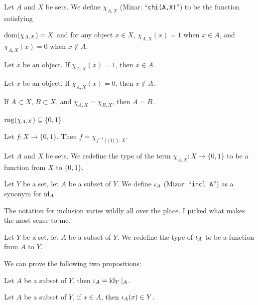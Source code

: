 \documentclass{article}
\begin{document}
\begin{definition}
Let $A$ and $X$ be sets.
We define $\chi_{A,X}$ (Mizar: ``\verb#chi(A,X)#'') to be the function
satisfying
\begin{defn}
\item $\operatorname{dom}(\chi_{A,X})=X$ and for any object $x\in X$,
  $\chi_{A,X}(x)=1$ when $x\in A$,
  and $\chi_{A,X}(x)=0$ when $x\notin A$.
\end{defn}
\end{definition}

\begin{thm}
\item\label{funct3:36} Let $x$ be an object.
  If $\chi_{A,X}(x)=1$, then $x\in A$.
\item\label{funct3:37} Let $x$ be an object.
  If $\chi_{A,X}(x)=0$, then $x\notin A$.
\item\label{funct3:38} If $A\subset X$, $B\subset X$, and $\chi_{A,X}=\chi_{B,X}$,
  then $A=B$.
\item\label{funct3:39} $\operatorname{rng}(\chi_{A,X})\subseteq\{0,1\}$.
\item\label{funct3:40} Let $f\colon X\to\{0,1\}$. Then $f=\chi_{f^{-1}(\{1\}),X}$.
\end{thm}

\begin{definition}
Let $A$ and $X$ be sets.
We redefine the type of the term $\chi_{A,X}\colon X\to\{0,1\}$
to be a function from $X$ to $\{0,1\}$.
\end{definition}

\begin{notation}
Let $Y$ be a set, let $A$ be a subset of $Y$.
We define $\iota_{A}$ (Mizar: ``\verb#incl A#'') as a synonym for $\operatorname{id}_{A}$.
\end{notation}

\begin{remark}
The notation for inclusion varies wildly all over the place. I picked
what makes the most sense to me.
\end{remark}

\begin{definition}
Let $Y$ be a set, let $A$ be a subset of $Y$.
We redefine the type of $\iota_{A}$ to be a function from $A$ to $Y$.
\end{definition}

We can prove the following two propositions:
\begin{thm}
\item\label{funct3:41} Let $A$ be a subset of $Y$, then $\iota_{A}=\operatorname{id}_{Y}|_{A}$.
\item\label{funct3:42} Let $A$ be a subset of $Y$,
  if $x\in A$, then $\iota_{A}(x)\in Y$.
\end{thm}
\end{document}
